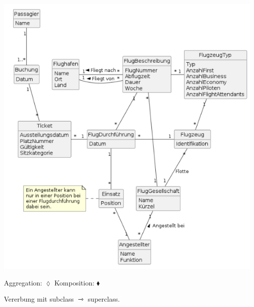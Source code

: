 \begin{multicols*}{3}
\includegraphics[height=\columnwidth-2em,angle=90]{uml2.png}

Aggregation: $\lozenge$ Komposition: $\blacklozenge $

Vererbung mit subclass {\huge$\rightarrowtriangle$} superclass.


\end{multicols*}

